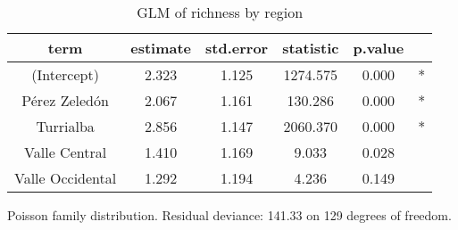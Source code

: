 \begin{table}[!h]
\centering
\caption{\label{tab:glm_rich}GLM of richness by region}
\centering
\fontsize{9}{11}\selectfont
\begin{threeparttable}
\begin{tabular}[t]{cccccc}
\hline\hline
term & estimate & std.error & statistic & p.value &  \\
\midrule
(Intercept) & 2.323 & 1.125 & 1274.575 & 0.000 & *\\
Pérez Zeledón & 2.067 & 1.161 & 130.286 & 0.000 & *\\
Turrialba & 2.856 & 1.147 & 2060.370 & 0.000 & *\\
Valle Central & 1.410 & 1.169 & 9.033 & 0.028 & \\
Valle Occidental & 1.292 & 1.194 & 4.236 & 0.149 & \\
\hline\hline
\end{tabular}
\begin{tablenotes}[para]
\item Poisson family distribution. Residual deviance: 141.33 on 129 degrees of freedom.
\end{tablenotes}
\end{threeparttable}
\end{table}
